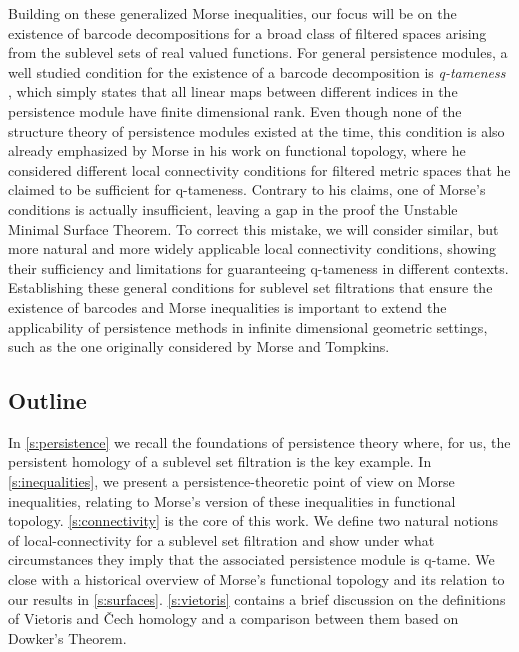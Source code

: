 Building on these generalized Morse inequalities, our focus will be on the existence of barcode decompositions for a broad class of filtered spaces arising from the sublevel sets of real valued functions.  
For general persistence modules, a well studied condition for the existence of a barcode decomposition is \emph{q-tameness} \cite{Chazal.2016a,Chazal.2016b}, which simply states that all linear maps between different indices in the persistence module have finite dimensional rank.
Even though none of the structure theory of persistence modules existed at the time, this condition is also already emphasized by Morse in his work on functional topology, where he considered different local connectivity conditions for filtered metric spaces that he claimed to be sufficient for q-tameness.
Contrary to his claims, one of Morse's conditions is actually insufficient, leaving a gap in the proof the Unstable Minimal Surface Theorem.
To correct this mistake, we will consider similar, but more natural and more widely applicable local connectivity conditions,
showing their sufficiency and limitations for guaranteeing q-tameness in different contexts.
Establishing these general conditions for sublevel set filtrations that ensure the existence of barcodes and Morse inequalities is important to extend the applicability of persistence methods in infinite dimensional geometric settings, such as the one originally considered by Morse and Tompkins.

\subsection*{Outline}
In \cref{s:persistence} we recall the foundations of persistence theory where, for us, the persistent homology of a sublevel set filtration is the key example.
In \cref{s:inequalities}, we present a persistence-theoretic point of view on Morse inequalities, relating to Morse's version of these inequalities in functional topology.
\cref{s:connectivity} is the core of this work.
We define two natural notions of local-connectivity for a sublevel set filtration and show under what circumstances they imply that the associated persistence module is q-tame.
We close with a historical overview of Morse's functional topology and its relation to our results in \cref{s:surfaces}.
\cref{s:vietoris} contains a brief discussion on the definitions of Vietoris and \v{C}ech homology and a comparison between them based on Dowker's Theorem.